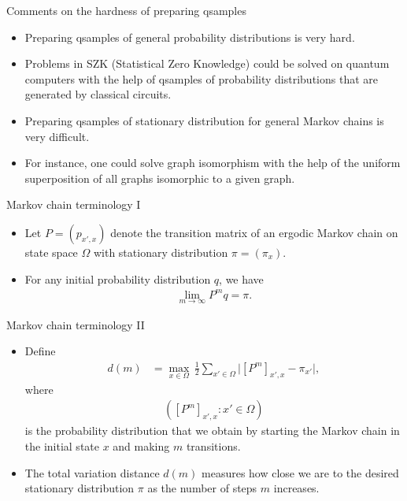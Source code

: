 \documentclass{beamer}
\renewcommand{\>}{\rangle}
\newcommand{\<}{\langle}
\begin{document}
\begin{frame}{Comments on the hardness of preparing qsamples}

\begin{itemize}
    \item Preparing qsamples of general probability distributions is very hard.

    \medskip
    \item Problems in SZK (Statistical Zero Knowledge) could be solved on quantum computers with the help of qsamples of probability distributions that are generated by classical circuits.
    
    \bigskip
    \item Preparing qsamples of stationary distribution for general Markov chains is very difficult.

    \medskip
    \item For instance, one could solve graph isomorphism with the help of the uniform superposition of all graphs isomorphic to a given graph.
\end{itemize}
    
\end{frame}


\begin{frame}{Markov chain terminology I}
\begin{itemize}
    \item Let $P=(p_{x',x})$ denote the transition matrix of an ergodic Markov chain on state space $\Omega$ with stationary distribution $\pi=(\pi_x)$.

    \medskip
    \item For any initial probability distribution $q$, we have
    \begin{align*}
        \lim_{m\rightarrow\infty} P^m q = \pi.
    \end{align*}
\end{itemize}
\end{frame}


\begin{frame}{Markov chain terminology II}
\begin{itemize}
    \item Define 
\begin{align*}
    d(m) 
    &=
    \max_{x\in\Omega} \, \frac{1}{2} \sum_{x'\in\Omega} 
    \big| [P^m]_{x',x} - \pi_{x'} \big|,
\end{align*}
where 
\begin{align*}
    ([P^m]_{x',x} : x' \in\Omega)
\end{align*} 
is the probability distribution that we obtain by starting the Markov chain in the initial state $x$ and making $m$ transitions.

\bigskip
\item The total variation distance $d(m)$ measures how close we are to the desired stationary distribution $\pi$ as the number of steps $m$ increases. 
\end{itemize}
\end{frame}
\end{document}
